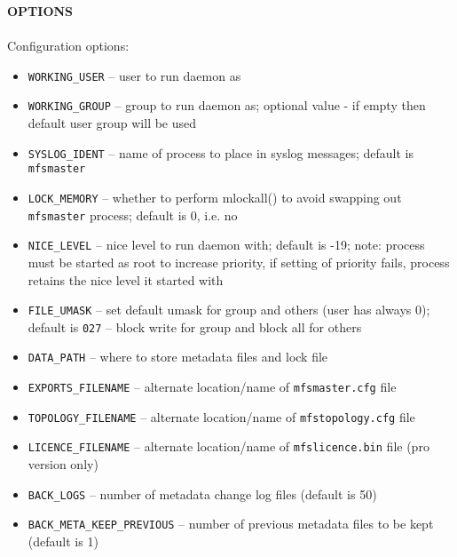 \documentclass[a4paper,11pt,english]{report}
\def\code#1{\texttt{#1}}
\begin{document}
				\bigskip
				\textbf{OPTIONS} \\\\
				Configuration options:
				\begin{itemize}
					\item \code{WORKING\_USER}
						-- user to run daemon as

					\item \code{WORKING\_GROUP}
						-- group to run daemon as; optional value - if empty  then  default
						user group will be used

					\item \code{SYSLOG\_IDENT}
						-- name  of process to place in syslog messages; default is \code{mfsmaster}

					\item \code{LOCK\_MEMORY}
						-- whether to perform mlockall() to avoid  swapping  out  \code{mfsmaster}
						process; default is 0, i.e. no

					\item \code{NICE\_LEVEL}
						-- nice  level  to  run  daemon with; default is -19; note: process
						must be started as root to increase priority, if setting of
						priority fails, process retains the nice level it started with

					\item \code{FILE\_UMASK}
						-- set  default  umask  for  group  and others (user has always 0);
						default is \code{027} -- block write for group and block all for others

					\item \code{DATA\_PATH}
						-- where to store metadata files and lock file

					\item \code{EXPORTS\_FILENAME}
						-- alternate location/name of \code{mfsmaster.cfg} file

					\item \code{TOPOLOGY\_FILENAME}
						-- alternate location/name of \code{mfstopology.cfg} file
						
					\item \code{LICENCE\_FILENAME}
						-- alternate location/name of \code{mfslicence.bin} file (pro version only)

					\item \code{BACK\_LOGS}
						-- number of metadata change log files (default is 50)

					\item \code{BACK\_META\_KEEP\_PREVIOUS}
						-- number of previous metadata files to be kept (default is 1)


\end{itemize}
\end{document}
